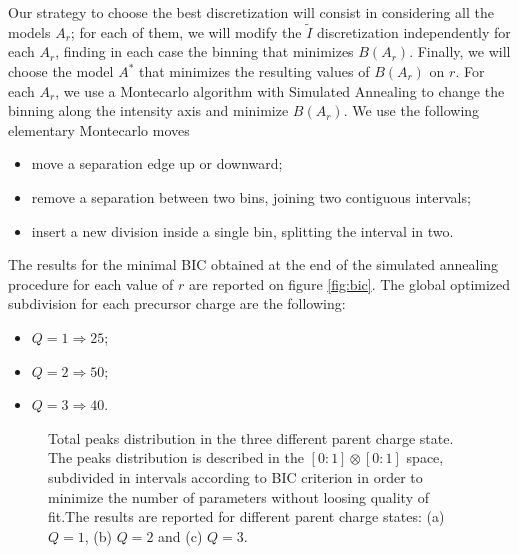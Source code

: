Our strategy to choose the best discretization will consist in considering all the models $A_r$; for each of them, 
we will modify the $\tilde I$ discretization independently for each $A_r$, 
finding in each case the binning that minimizes  $B(A_r)$. Finally, we will choose the
model $A^*$ that minimizes the resulting values of
$B(A_r)$ on $r$.
For each $A_r$,  we use a Montecarlo algorithm with Simulated Annealing to
change the binning along the intensity axis and minimize $B(A_r)$. We use the
following  elementary Montecarlo moves
\begin{itemize}
\item move a separation edge up or downward;
\item remove a separation between two bins, joining two contiguous intervals;
\item insert a new division inside a single bin, splitting the interval in two.
\end{itemize}
The results for the minimal BIC obtained at the end of the simulated annealing
procedure for each value of $r$ are reported on figure \ref{fig:bic}.
The global optimized subdivision for each precursor charge  are the following:
\begin{itemize}
 \item $Q=1 \Rightarrow 25$;
 \item $Q=2 \Rightarrow 50$;
 \item $Q=3 \Rightarrow 40$.
\end{itemize}

\begin{figure}[!thb]
\begin{center}
\subfigure[$Q=1$]{
\resizebox{0.4\textwidth}{!}{\sffamily}}
\subfigure[$Q=2$]{
\resizebox{0.4\textwidth}{!}{\sffamily}}
\subfigure[$Q=3$]{
\resizebox{0.4\textwidth}{!}{\sffamily}}
\caption{\label{fig:peaks-dist}
Total peaks distribution in the three different parent charge state. The peaks
distribution is described in the $[0:1]\otimes[0:1]$ space, subdivided in
intervals according to BIC criterion in order to minimize the number of
parameters without loosing quality of fit.The results are reported for different
parent charge states: (a) $Q=1$, (b) $Q=2$ and (c) $Q=3$.}
\end{center}
\end{figure}

